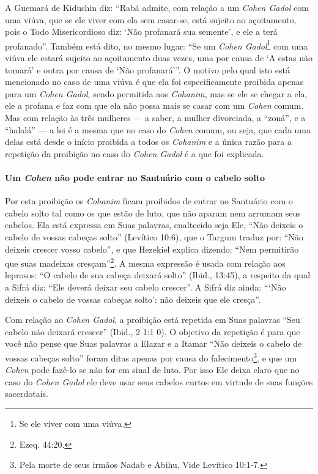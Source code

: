 A Guemará de Kidushin diz: ``Rabá admite, com relação a um \textit{Cohen
Gadol} com uma viúva, que se ele viver com ela sem casar-se, está
sujeito ao açoitamento, pois o Todo Misericordioso diz: `Não profanará
sua semente', e ele a terá profanado''. Também está dito, no mesmo
lugar: ``Se um \textit{Cohen Gadol}\footnote{Se ele viver com uma viúva.} com uma viúva ele estará sujeito ao açoitamento duas vezes, uma por causa de `A estas não
tomará' e outra por causa de `Não profanará'''. O motivo pelo qual isto
está mencionado no caso de uma viúva é que ela foi especificamente
proibida apenas para um \textit{Cohen Gadol}, sendo permitida aos
\textit{Cohanim}, mas se ele se chegar a ela, ele a profana e faz com que
ela não possa mais se casar com um \textit{Cohen} comum. Mas com relação às
três mulheres --- a saber, a mulher divorciada, a ``zoná'', e a ``halalá'' --- a lei é a mesma que no caso do \textit{Cohen} comum, ou seja, que cada uma delas está desde o
início proibida a todos os \textit{Cohanim} e a única razão para a repetição
da proibição no caso do \textit{Cohen Gadol} é a que foi explicada.

\paragraph{Um \textit{Cohen} não pode entrar no Santuário com o cabelo solto}

Por esta proibição os \textit{Cohanim} ficam proibidos de entrar no Santuário
com o cabelo solto tal como os que estão de luto, que não aparam nem
arrumam seus cabelos. Ela está expressa em Suas palavras, enaltecido
seja Ele, ``Não deixeis o cabelo de vossas cabeças solto'' (Levítico
10:6), que o Targum traduz por: ``Não deixeis crescer vosso cabelo'', e
que Hezekiel explica dizendo: ``Nem permitirão que suas madeixas
cresçam''\footnote{Ezeq. 44:20.}. A mesma expressão é usada com relação
aos leprosos: ``O cabelo de sua cabeça deixará solto'' (Ibid., 13:45), a
respeito da qual a Sifrá diz: ``Ele deverá deixar seu cabelo crescer''.
A Sifrá diz ainda: ```Não deixeis o cabelo de vossas cabeças solto': não
deixeis que ele cresça''.

Com relação ao \textit{Cohen Gadol}, a proibição está repetida em Suas
palavras ``Seu cabelo não deixará crescer'' (Ibid., 2 1:1 0). O objetivo
da repetição é para que você não pense que Suas palavras a Elazar e a
Itamar ``Não deixeis o cabelo de vossas cabeças solto'' foram ditas
apenas por causa do falecimento\footnote{Pela morte de seus irmãos Nadab e Abihu. Vide Levítico 10:1-7.}, e que um
\textit{Cohen} pode fazê-lo se não for em sinal de luto. Por isso Ele deixa
claro que no caso do \textit{Cohen Gadol} ele deve usar seus cabelos curtos
em virtude de suas funções sacerdotais.

